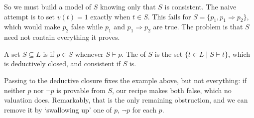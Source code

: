 \documentclass[a4paper]{scrartcl}
\begin{document}
So we must build a model of $S$ knowing only that $S$ is consistent. The naive attempt is to set $v(t) = 1$ exactly when $t \in S$. This fails for $S = \{p_1, p_1 \Rightarrow p_2\}$, which would make $p_2$ false while $p_1$ and $p_1 \Rightarrow p_2$ are true. The problem is that $S$ need not contain everything it proves.

\begin{definition}
  A set $S \subseteq L$ is  if $p \in S$ whenever $S \vdash p$. The  of $S$ is the set $\{t \in L \mid S \vdash t\}$, which is deductively closed, and consistent if $S$ is.
\end{definition}

Passing to the deductive closure fixes the example above, but not everything: if neither $p$ nor $\lnot p$ is provable from $S$, our recipe makes both false, which no valuation does. Remarkably, that is the only remaining obstruction, and we can remove it by `swallowing up' one of $p$, $\lnot p$ for each $p$.
\end{document}
